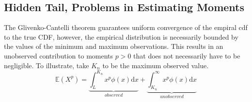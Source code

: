 \subsection{Hidden Tail, Problems in Estimating Moments}
The Glivenko-Cantelli theorem guarantees uniform convergence of the empiral cdf to the true CDF, however, the empirical distribution is necessarily bounded by the values of the minimum and maximum observations. This results in an unobserved contribution to moments $p>0$ that does not necessarily have to be negligible. To illustrate, take $K_n$ to be the maximum observed value. 
\begin{equation}
\mathbb{E}(X^p) = \underbrace{\int_{L}^{K_n} x^p \phi(x)\mathrm{d}x}_{observed} + \underbrace{\int_{K_n}^{\infty} x^p \phi(x)\mathrm{d}x}_{unobserved}
\end{equation}


